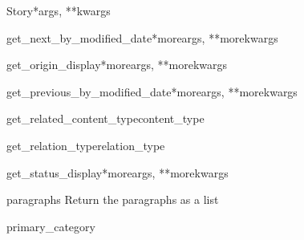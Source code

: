 \documentclass[letterpaper,10pt,english]{manual}
\begin{document}
\begin{classdesc}{Story}{*args, **kwargs}
\hypertarget{stories.models.Story.get\_next\_by\_modified\_date}{}\begin{methoddesc}[Story]{get\_next\_by\_modified\_date}{*moreargs, **morekwargs}\end{methoddesc}

\hypertarget{stories.models.Story.get\_origin\_display}{}\begin{methoddesc}[Story]{get\_origin\_display}{*moreargs, **morekwargs}\end{methoddesc}

\hypertarget{stories.models.Story.get\_previous\_by\_modified\_date}{}\begin{methoddesc}[Story]{get\_previous\_by\_modified\_date}{*moreargs, **morekwargs}\end{methoddesc}

\hypertarget{stories.models.Story.get\_related\_content\_type}{}\begin{methoddesc}[Story]{get\_related\_content\_type}{content\_type}\end{methoddesc}

\hypertarget{stories.models.Story.get\_relation\_type}{}\begin{methoddesc}[Story]{get\_relation\_type}{relation\_type}\end{methoddesc}

\hypertarget{stories.models.Story.get\_status\_display}{}\begin{methoddesc}[Story]{get\_status\_display}{*moreargs, **morekwargs}\end{methoddesc}

\hypertarget{stories.models.Story.paragraphs}{}\begin{memberdesc}[Story]{paragraphs}
Return the paragraphs as a list
\end{memberdesc}

\hypertarget{stories.models.Story.primary\_category}{}\begin{memberdesc}[Story]{primary\_category}\end{memberdesc}


\end{classdesc}
\end{document}
